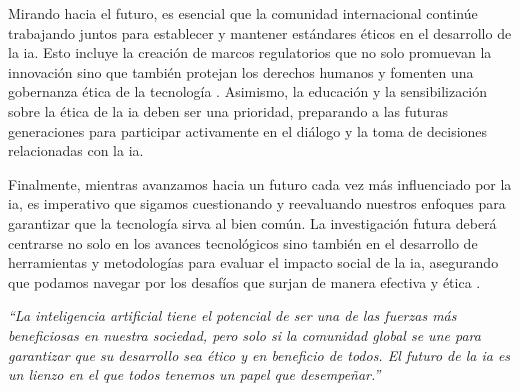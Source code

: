 Mirando hacia el futuro, es esencial que la comunidad internacional continúe trabajando juntos para establecer y mantener estándares éticos en el desarrollo de la \acrshort{ia}. Esto incluye la creación de marcos regulatorios que no solo promuevan la innovación sino que también protejan los derechos humanos y fomenten una gobernanza ética de la tecnología \cite{Kumar2024}. Asimismo, la educación y la sensibilización sobre la ética de la \acrshort{ia} deben ser una prioridad, preparando a las futuras generaciones para participar activamente en el diálogo y la toma de decisiones relacionadas con la \acrshort{ia}.

Finalmente, mientras avanzamos hacia un futuro cada vez más influenciado por la \acrshort{ia}, es imperativo que sigamos cuestionando y reevaluando nuestros enfoques para garantizar que la tecnología sirva al bien común. La investigación futura deberá centrarse no solo en los avances tecnológicos sino también en el desarrollo de herramientas y metodologías para evaluar el impacto social de la \acrshort{ia}, asegurando que podamos navegar por los desafíos que surjan de manera efectiva y ética \cite{Robinson2023}.

\textit{“La inteligencia artificial tiene el potencial de ser una de las fuerzas más beneficiosas en nuestra sociedad, pero solo si la comunidad global se une para garantizar que su desarrollo sea ético y en beneficio de todos. El futuro de la \acrshort{ia} es un lienzo en el que todos tenemos un papel que desempeñar.”}

